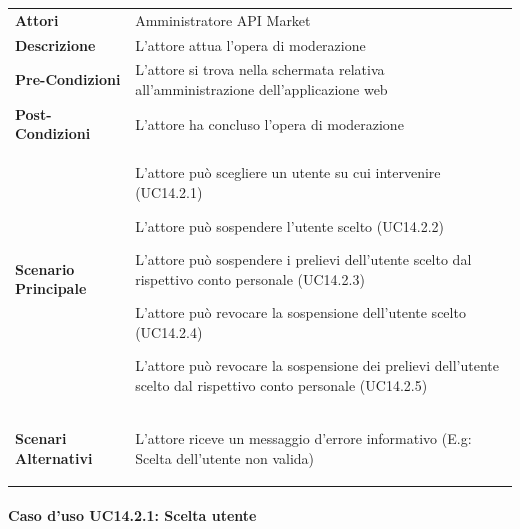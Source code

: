 \begin{minipage}{\linewidth}
	\begin{tabular}{ l | p{11cm}}
		\hline
		\rowcolor{Gray}
		\multicolumn{2}{c}{UC14.2 - Moderazione utenza} \\
		\hline
		\textbf{Attori} &  Amministratore API Market \\
		\textbf{Descrizione} & L'attore attua l'opera di moderazione \\
		\textbf{Pre-Condizioni} & L'attore si trova nella schermata relativa all'amministrazione dell'applicazione web \\
		\textbf{Post-Condizioni} & L'attore ha concluso l'opera di moderazione \\
		\textbf{Scenario Principale} & 
		\begin{enumerate*}[label=(\arabic*.),itemjoin={\newline}]
			\item L'attore può scegliere un utente su cui intervenire (UC14.2.1)
			\item L'attore può sospendere l'utente scelto (UC14.2.2)
			\item L'attore può sospendere i prelievi dell'utente scelto dal rispettivo conto personale (UC14.2.3)
			\item L'attore può revocare la sospensione dell'utente scelto (UC14.2.4)
			\item L'attore può revocare la sospensione dei prelievi dell'utente scelto dal rispettivo conto personale (UC14.2.5)
		\end{enumerate*}\\
		\textbf{Scenari Alternativi} & 
		\begin{enumerate*}[label=(\arabic*.),itemjoin={\newline}]
			\item L'attore riceve un messaggio d'errore informativo (E.g: Scelta dell'utente non valida)
		\end{enumerate*}\\
	\end{tabular}
\end{minipage}

\paragraph{Caso d'uso UC14.2.1: Scelta utente}
\label{UC14_2_1}

